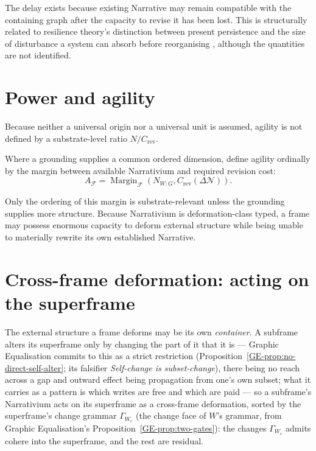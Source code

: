\documentclass[11pt,a4paper]{article}
\theoremstyle{remark}
\newcommand{\Narr}{\mathcal N}
\newcommand{\Frame}{\mathcal F}
\begin{document}
The delay exists because existing Narrative may remain compatible with the containing graph after the capacity to revise it has been lost. This is structurally related to resilience theory's distinction between present persistence and the size of disturbance a system can absorb before reorganising \citep{holling1973resilience}, although the quantities are not identified.

\section{Power and agility}\label{sec:power-agility}

Because neither a universal origin nor a universal unit is assumed, agility is not defined by a substrate-level ratio $N/C_{\mathrm{rev}}$.

Where a grounding supplies a common ordered dimension, define agility ordinally by the margin between available Narrativium and required revision cost:
\[
\boxed{
A_{\Frame}
=
\operatorname{Margin}_{\Frame}
\left(
N_{W:G},
C_{\mathrm{rev}}(\Delta\Narr)
\right).
}
\]

Only the ordering of this margin is substrate-relevant unless the grounding supplies more structure. Because Narrativium is deformation-class typed, a frame may possess enormous capacity to deform external structure while being unable to materially rewrite its own established Narrative.

\section{Cross-frame deformation: acting on the superframe}\label{sec:cross-frame-deformation}

The external structure a frame deforms may be its own \emph{container}. A subframe alters its superframe only by changing the part of it that it is --- Graphic Equalisation commits to this as a strict restriction (Proposition~\ref{GE-prop:no-direct-self-alter}; its falsifier \emph{Self-change is subset-change}), there being no reach across a gap and outward effect being propagation from one's own subset; what it carries as a pattern is which writes are free and which are paid --- so a subframe's Narrativium acts on its superframe as a cross-frame deformation, sorted by the superframe's change grammar $\Gamma_{W_c}$ (the change face of $W$'s grammar, from Graphic Equalisation's Proposition~\ref{GE-prop:two-gates}): the changes $\Gamma_{W_c}$ admits cohere into the superframe, and the rest are residual.
\end{document}
